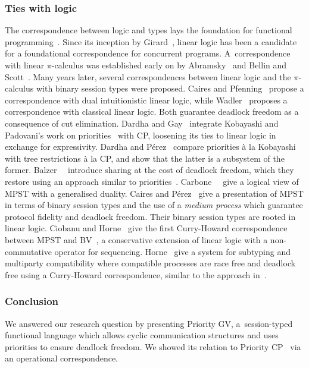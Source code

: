 \subsubsection*{Ties with logic}
The correspondence between logic and types lays the foundation for functional programming~\cite{wadler15}.
Since its inception by Girard~\cite{girard87}, linear logic has been a candidate for a foundational correspondence for concurrent programs.
A~correspondence with linear $\pi$-calculus was established early on by Abramsky~\cite{abramsky94} and Bellin and Scott~\cite{bellinscott94}. Many years later, several correspondences between linear logic and the $\pi$-calculus with binary session types were proposed. Caires and Pfenning~\cite{cairespfenning10} propose a correspondence with dual intuitionistic linear logic, while Wadler~\cite{wadler14} proposes a correspondence with classical linear logic. Both guarantee deadlock freedom as a consequence of cut elimination.
Dardha and Gay~\cite{dardhagay18extended} integrate Kobayashi and Padovani's work on priorities~\cite{kobayashi06,padovani14} with CP, loosening its ties to linear logic in exchange for expressivity.
Dardha and P\'{e}rez~\cite{dardhaperez15extended} compare priorities \`a la Kobayashi with tree restrictions \`a la CP, and show that the latter is a subsystem of the former.
Balzer~\etal~\cite{balzerpfenning17} introduce sharing at the cost of deadlock freedom, which they restore using an approach similar to priorities~\cite{balzertoninho19}.
Carbone~\etal~\cite{CarboneMSY15,carbonelindley16} give a logical view of MPST with a generalised duality.
Caires and P\'{e}rez~\cite{CairesP16} give a presentation of MPST in terms of binary session types and the use of a \emph{medium process} which guarantee protocol fidelity and deadlock freedom. Their binary session types are rooted in linear logic.
Ciobanu and Horne~\cite{CiobanuH15} give the first Curry-Howard correspondence between MPST and BV~\cite{Guglielmi07}, a conservative extension of linear logic with a non-commutative operator for sequencing.
Horne~\cite{Horne20} give a system for subtyping and multiparty compatibility where compatible processes are race free and deadlock free using a Curry-Howard correspondence, similar to the approach in~\cite{CiobanuH15}.

\subsubsection*{Conclusion}
We answered our research question by presenting Priority GV, a~session-typed functional language which allows cyclic communication structures and uses priorities to ensure deadlock freedom. We showed its relation to Priority CP~\cite{dardhagay18extended} via an operational correspondence.

